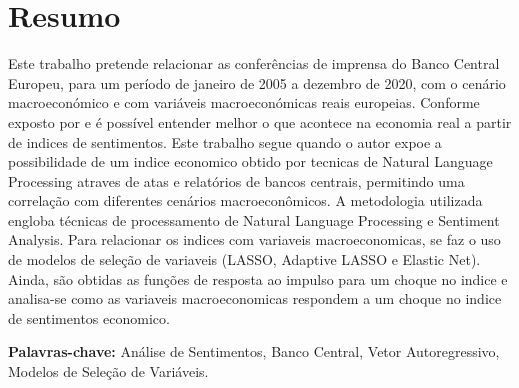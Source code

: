 \chapter*{Resumo}
Este trabalho pretende relacionar as conferências de imprensa do Banco Central Europeu, para um período de janeiro de 2005 a dezembro de 2020, com o cenário macroeconómico e com variáveis macroeconómicas reais europeias. Conforme exposto por \cite[]{shapiro2020measuring, shapiro2021taking} e \cite[]{barsky2012information} é possível entender melhor o que acontece na economia real a partir de indices de sentimentos. Este trabalho segue \cite{shapiro2020measuring} quando o autor expoe a possibilidade de um indice economico obtido por tecnicas de Natural Language Processing atraves de atas e relatórios de bancos centrais, permitindo uma correlação com diferentes cenários macroeconômicos. A metodologia utilizada engloba técnicas de processamento de Natural Language Processing e Sentiment Analysis. Para relacionar os indices com variaveis macroeconomicas, se faz o uso de modelos de seleção de variaveis (LASSO, Adaptive LASSO e Elastic Net). Ainda, são obtidas as funções de resposta ao impulso para um choque no indice e analisa-se como as variaveis macroeconomicas respondem a um choque no indice de sentimentos economico.



\par
\vspace{0.5in}

\noindent
{\bf Palavras-chave:} Análise de Sentimentos, Banco Central, Vetor Autoregressivo, Modelos de Seleção de Variáveis.